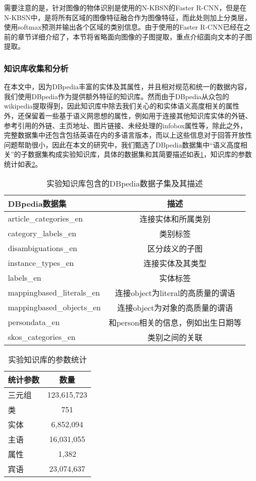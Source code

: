 需要注意的是，针对图像的物体识别是使用的N-KBSN的Faster R-CNN，但是在N-KBSN中，是将所有区域的图像特征融合作为图像特征，而此处则加上分类层，使用softmax预测并输出各个区域的类别信息。由于使用的Faster R-CNN已经在之前的章节详细介绍了，本节将省略面向图像的子图提取，重点介绍面向文本的子图提取。

\subsubsection{知识库收集和分析}
在本文中，因为DBpedia丰富的实体及其属性，并且相对规范和统一的数据内容，我们使用DBpedia作为提供额外特征的知识库。然而由于DBpedia从众包的wikipedia提取得到，因此知识库中除去我们关心的和实体语义高度相关的属性外，还保留着一些基于语义网思想的属性，例如用于连接其他知识库实体的外链、参考引用的外链、主页地址、图片链接、未经处理的infobox属性等，除此之外，完整数据集中还包含包括英语在内的多语言版本，而以上这些信息对于回答开放性问题帮助很小，因此在本文的研究中，我们甄选了DBpedia数据集中“语义高度相关”的子数据集构成实验知识库，具体的数据集和其简要描述如表\ref{dbpeidaList}，知识库的参数统计如表\ref{dbpediaPara}。
\begin{table}[H]
\centering
\caption{实验知识库包含的DBpedia数据子集及其描述}
\begin{tabular*}{0.9\textwidth}{lc}
\toprule
\textbf{DBpedia数据集} & \textbf{描述}\\
\midrule
article\_categories\_en & 连接实体和所属类别 \\
category\_labels\_en &  类别标签 \\
disambiguations\_en &  区分歧义的子图 \\
instance\_types\_en & 连接实体及其类型 \\
labels\_en & 实体标签 \\
mappingbased\_literals\_en & 连接object为literal的高质量的谓语 \\
mappingbased\_objects\_en & 连接object为对象的高质量的谓语 \\
persondata\_en & 和person相关的信息，例如出生日期等 \\
skos\_categories\_en & 类别之间的关联 \\
\bottomrule
\end{tabular*}
\label{dbpeidaList}
\end{table}
\begin{table}[H]
\centering
\caption{实验知识库的参数统计}
\begin{tabular}{lc}
\toprule
\textbf{统计参数} & \textbf{数量}\\
\midrule
三元组 &  123,615,723\\
类 &  751\\
实体 & 6,852,094 \\
主语 & 16,031,055 \\
属性 & 1,382 \\
宾语 & 23,074,637 \\
\bottomrule
\end{tabular}
\label{dbpediaPara}
\end{table}


